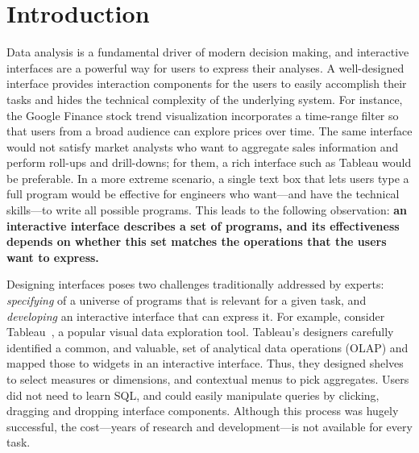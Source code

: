 \section{Introduction}
\label{sec:intro}

Data analysis is a fundamental driver of modern decision making, and interactive interfaces are a powerful way for users to express their analyses. A well-designed interface provides interaction components for the users to easily accomplish their tasks and hides the technical complexity of the underlying system.  For instance, the Google Finance stock trend visualization incorporates a time-range filter so that users from a broad audience can explore prices over time. The same interface would not satisfy market analysts who want to aggregate sales information and perform roll-ups and drill-downs; for them, a rich interface such as Tableau would be preferable.  In a more extreme scenario, a single text box that lets users type a full program would be effective for engineers who want---and have the technical skills---to write all possible programs. This leads to the following observation:
\textbf{an interactive interface describes a set of programs, and its effectiveness depends on whether this set matches the operations that the users want to express.}

Designing interfaces poses two challenges traditionally addressed by experts:
{\it specifying} of a universe of programs that is relevant for a given task, and {\it developing} an interactive interface that can express it.
For example, consider Tableau~\cite{stolte2002polaris}, a popular visual data exploration tool. Tableau's designers carefully identified a common, and valuable, set of analytical data operations (OLAP) and mapped those to widgets in an interactive interface. Thus, they designed shelves to select measures or dimensions, and contextual menus to pick aggregates. Users did not need to learn SQL, and could easily manipulate queries by clicking, dragging and dropping interface components. Although this process was hugely successful, the cost---years of research and development---is not available for every task.

